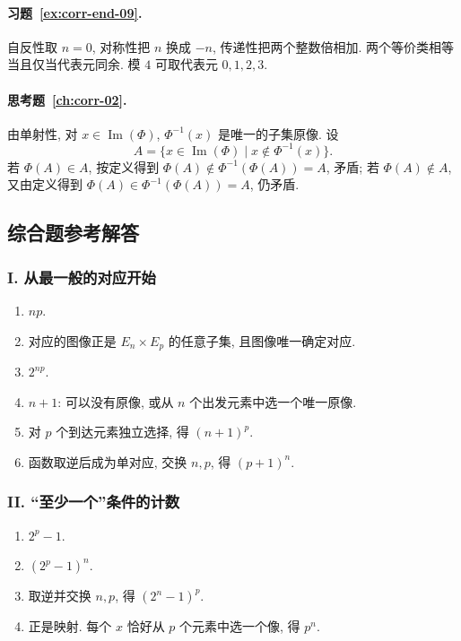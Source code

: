 \documentclass[usesamecnt, thmcnt=section, lang=cn, newtx, 10pt, scheme=chinese]{elegantbook}
\begin{document}
\paragraph*{习题~\ref{ex:corr-end-09}.}
自反性取 $n=0$, 对称性把 $n$ 换成 $-n$, 传递性把两个整数倍相加. 两个等价类相等当且仅当代表元同余. 模 $4$ 可取代表元 $0,1,2,3$.

\paragraph*{思考题~\ref{ch:corr-02}.}
由单射性, 对 $x\in\operatorname{Im}(\Phi)$, $\Phi^{-1}(x)$ 是唯一的子集原像. 设
\[
 A=\{x\in\operatorname{Im}(\Phi)\mid x\notin\Phi^{-1}(x)\}.
\]
若 $\Phi(A)\in A$, 按定义得到 $\Phi(A)\notin\Phi^{-1}(\Phi(A))=A$, 矛盾; 若 $\Phi(A)\notin A$, 又由定义得到 $\Phi(A)\in\Phi^{-1}(\Phi(A))=A$, 仍矛盾.

\subsection*{综合题参考解答}

\subsubsection*{I. 从最一般的对应开始}
\begin{enumerate}[label=\textbf{\arabic*.}]
  \item $np$.
  \item 对应的图像正是 $E_n\times E_p$ 的任意子集, 且图像唯一确定对应.
  \item $2^{np}$.
  \item $n+1$: 可以没有原像, 或从 $n$ 个出发元素中选一个唯一原像.
  \item 对 $p$ 个到达元素独立选择, 得 $(n+1)^p$.
  \item 函数取逆后成为单对应, 交换 $n,p$, 得 $(p+1)^n$.
\end{enumerate}

\subsubsection*{II. ``至少一个''条件的计数}
\begin{enumerate}[label=\textbf{\arabic*.}, start=7]
  \item $2^p-1$.
  \item $(2^p-1)^n$.
  \item 取逆并交换 $n,p$, 得 $(2^n-1)^p$.
  \item 正是映射. 每个 $x$ 恰好从 $p$ 个元素中选一个像, 得 $p^n$.
\end{enumerate}
\end{document}
